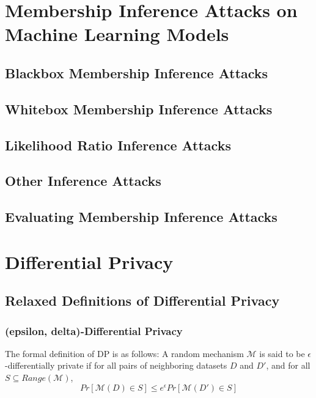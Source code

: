 \section{Membership Inference Attacks on Machine Learning Models}
\label{sec:mia}

\subsection{Blackbox Membership Inference Attacks}
\label{sec:blackboxmia}

\subsection{Whitebox Membership Inference Attacks}
\label{sec:whiteboxmia}

\subsection{Likelihood Ratio Inference Attacks}
\label{sec:lira}


\subsection{Other Inference Attacks}
\label{sec:othermia}

\subsection{Evaluating Membership Inference Attacks}
\label{sec:evalmia}



\section{Differential Privacy}
\label{sec:dp}

\subsection{Relaxed Definitions of Differential Privacy}
\label{sec:relaxeddp}




\subsubsection{(epsilon, delta)-Differential Privacy}
\label{sec:eddp}

The formal definition of DP is as follows:
A random mechanism $\mathcal{M}$ is said to be $\epsilon$-differentially private if for all pairs of neighboring datasets $D$ and $D'$, and for all $S \subseteq Range(\mathcal{M})$,
\begin{equation}
    Pr[\mathcal{M}(D) \in S] \leq e^{\epsilon} Pr[\mathcal{M}(D') \in S]
\end{equation}
    

